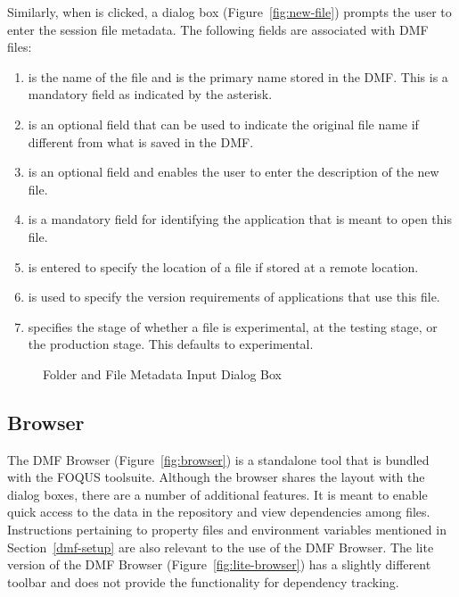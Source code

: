 {Similarly, when  is clicked, a dialog box (Figure~\ref{fig:new-file}) prompts the user to enter the session file metadata.
The following fields are associated with DMF files:
\begin{enumerate}
\item {} is the name of the file and is the primary name stored in the DMF.
  This is a mandatory field as indicated by the asterisk.
\item {} is an optional field that can be used to indicate the original file name if different
  from what is saved in the DMF.
\item {} is an optional field and enables the user to enter the description of the new file.
\item {} is a mandatory field for identifying the application that is meant to open this file.
\item {} is entered to specify the location of a file if stored at a remote location.
\item {} is used to specify the version requirements of applications that use this file.
\item {} specifies the stage of whether a file is experimental, at the testing stage, or the production stage. This defaults to experimental.
\end{enumerate}

\begin{figure}[H]
	\centering
	\centering
	\qquad
	\caption{Folder and File Metadata Input Dialog Box}
\end{figure}

\subsection{Browser}
The DMF Browser (Figure~\ref{fig:browser}) is a standalone tool that is bundled with the FOQUS toolsuite.
Although the browser shares the layout with the dialog boxes, there are a number of additional features.
It is meant to enable quick access to the data in the repository and view dependencies among files.
Instructions pertaining to property files and environment variables mentioned in Section~\ref{dmf-setup} are
also relevant to the use of the DMF Browser. The lite version of the DMF Browser (Figure~\ref{fig:lite-browser})
has a slightly different toolbar and
does not provide the functionality for dependency tracking.

}
